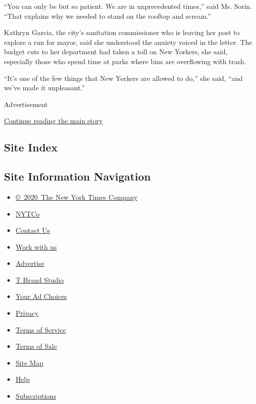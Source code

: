 ``You can only be but so patient. We are in unprecedented times,'' said
Ms. Sorin. ``That explains why we needed to stand on the rooftop and
scream.''

Kathryn Garcia, the city's sanitation commissioner who is leaving her
post to explore a run for mayor, said she understood the anxiety voiced
in the letter. The budget cuts to her department had taken a toll on New
Yorkers, she said, especially those who spend time at parks where bins
are overflowing with trash.

``It's one of the few things that New Yorkers are allowed to do,'' she
said, ``and we've made it unpleasant.''

Advertisement

\protect\hyperlink{after-bottom}{Continue reading the main story}

\hypertarget{site-index}{%
\subsection{Site Index}\label{site-index}}

\hypertarget{site-information-navigation}{%
\subsection{Site Information
Navigation}\label{site-information-navigation}}

\begin{itemize}
\tightlist
\item
  \href{https://help.nytimes3xbfgragh.onion/hc/en-us/articles/115014792127-Copyright-notice}{©~2020~The
  New York Times Company}
\end{itemize}

\begin{itemize}
\tightlist
\item
  \href{https://www.nytco.com/}{NYTCo}
\item
  \href{https://help.nytimes3xbfgragh.onion/hc/en-us/articles/115015385887-Contact-Us}{Contact
  Us}
\item
  \href{https://www.nytco.com/careers/}{Work with us}
\item
  \href{https://nytmediakit.com/}{Advertise}
\item
  \href{http://www.tbrandstudio.com/}{T Brand Studio}
\item
  \href{https://www.nytimes3xbfgragh.onion/privacy/cookie-policy\#how-do-i-manage-trackers}{Your
  Ad Choices}
\item
  \href{https://www.nytimes3xbfgragh.onion/privacy}{Privacy}
\item
  \href{https://help.nytimes3xbfgragh.onion/hc/en-us/articles/115014893428-Terms-of-service}{Terms
  of Service}
\item
  \href{https://help.nytimes3xbfgragh.onion/hc/en-us/articles/115014893968-Terms-of-sale}{Terms
  of Sale}
\item
  \href{https://spiderbites.nytimes3xbfgragh.onion}{Site Map}
\item
  \href{https://help.nytimes3xbfgragh.onion/hc/en-us}{Help}
\item
  \href{https://www.nytimes3xbfgragh.onion/subscription?campaignId=37WXW}{Subscriptions}
\end{itemize}
